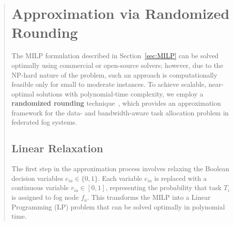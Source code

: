 \documentclass[conference]{IEEEtran}
\begin{document}
\begin{abstract}


\section{Approximation via Randomized Rounding}
\label{sec:randomized}

The MILP formulation described in Section~\ref{sec:MILP} can be solved optimally using commercial or open-source solvers; however, due to the NP-hard nature of the problem, such an approach is computationally feasible only for small to moderate instances. To achieve scalable, near-optimal solutions with polynomial-time complexity, we employ a \textbf{randomized rounding} technique~\cite{raghavan1987randomized}, which provides an approximation framework for the data- and bandwidth-aware task allocation problem in federated fog systems.

\subsection{Linear Relaxation}

The first step in the approximation process involves relaxing the Boolean decision variables \( e_{ia} \in \{0,1\} \).  
Each variable \( e_{ia} \) is replaced with a continuous variable \( r_{ia} \in [0,1] \), representing the probability that task \( T_i \) is assigned to fog node \( f_a \).  
This transforms the MILP into a Linear Programming (LP) problem that can be solved optimally in polynomial time.


\end{abstract}
\end{document}
